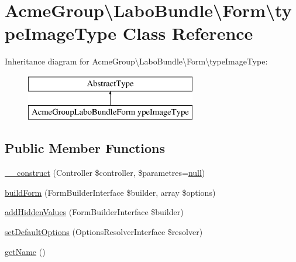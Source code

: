 \hypertarget{class_acme_group_1_1_labo_bundle_1_1_form_1_1type_image_type}{\section{Acme\+Group\textbackslash{}Labo\+Bundle\textbackslash{}Form\textbackslash{}type\+Image\+Type Class Reference}
\label{class_acme_group_1_1_labo_bundle_1_1_form_1_1type_image_type}
}
Inheritance diagram for Acme\+Group\textbackslash{}Labo\+Bundle\textbackslash{}Form\textbackslash{}type\+Image\+Type\+:\begin{figure}[H]
\begin{center}
\leavevmode
\includegraphics[height=2.000000cm]{class_acme_group_1_1_labo_bundle_1_1_form_1_1type_image_type}
\end{center}
\end{figure}
\subsection*{Public Member Functions}
\begin{DoxyCompactItemize}
\item 
\hyperlink{class_acme_group_1_1_labo_bundle_1_1_form_1_1type_image_type_af5da76e3f81d3e2a7a39ccdf1a66debe}{\+\_\+\+\_\+construct} (Controller \$controller, \$parametres=\hyperlink{validate_8js_afb8e110345c45e74478894341ab6b28e}{null})
\item 
\hyperlink{class_acme_group_1_1_labo_bundle_1_1_form_1_1type_image_type_abb703427cb572bb5da9b67a026d6e4ca}{build\+Form} (Form\+Builder\+Interface \$builder, array \$options)
\item 
\hyperlink{class_acme_group_1_1_labo_bundle_1_1_form_1_1type_image_type_a6c5be841898012a7ce5f98f22b61b69a}{add\+Hidden\+Values} (Form\+Builder\+Interface \$builder)
\item 
\hyperlink{class_acme_group_1_1_labo_bundle_1_1_form_1_1type_image_type_a9a1148f1a49d088f7054dce971859d1e}{set\+Default\+Options} (Options\+Resolver\+Interface \$resolver)
\item 
\hyperlink{class_acme_group_1_1_labo_bundle_1_1_form_1_1type_image_type_ab19bb9b1623b4c240caa166afa9db49a}{get\+Name} ()
\end{DoxyCompactItemize}


